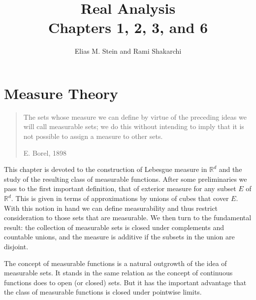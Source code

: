 \documentclass[11pt,openany]{book}
\title{Real Analysis\\Chapters 1, 2, 3, and 6}
\author{Elias M. Stein and Rami Shakarchi}
\date{}
\begin{document}
\maketitle
\tableofcontents
\clearpage

%

\chapter{Measure Theory}

\begin{quote}
The sets whose measure we can define by virtue of the preceding ideas we will call measurable sets; we do this without intending to imply that it is not possible to assign a measure to other sets.

\hfill E. Borel, 1898
\end{quote}

This chapter is devoted to the construction of Lebesgue measure in $\mathbb{R}^d$ and the study of the resulting class of measurable functions. After some preliminaries we pass to the first important definition, that of exterior measure for any subset $E$ of $\mathbb{R}^d$. This is given in terms of approximations by unions of cubes that cover $E$. With this notion in hand we can define measurability and thus restrict consideration to those sets that are measurable. We then turn to the fundamental result: the collection of measurable sets is closed under complements and countable unions, and the measure is additive if the subsets in the union are disjoint.

The concept of measurable functions is a natural outgrowth of the idea of measurable sets. It stands in the same relation as the concept of continuous functions does to open (or closed) sets. But it has the important advantage that the class of measurable functions is closed under pointwise limits.
\end{document}

